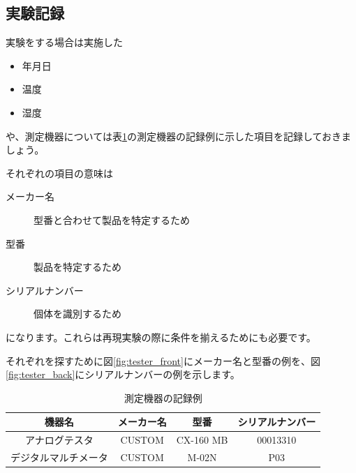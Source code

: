 \documentclass[dvipdfmx, a4paper]{jsarticle}
\begin{document}
\subsection{実験記録}
実験をする場合は実施した
\begin{itemize}
    \item 年月日
    \item 温度
    \item 湿度
\end{itemize}
や、測定機器については表\ref{tab:label_measure_table}の測定機器の記録例に示した項目を記録しておきましょう。

それぞれの項目の意味は
\begin{description}
    \item[メーカー名] 型番と合わせて製品を特定するため
    \item[型番] 製品を特定するため
    \item[シリアルナンバー] 個体を識別するため
\end{description}
になります。これらは再現実験の際に条件を揃えるためにも必要です。

それぞれを探すために図\ref{fig:tester_front}にメーカー名と型番の例を、図 \ref{fig:tester_back}にシリアルナンバーの例を示します。

\begin{table}[htbp]
    \centering
    \caption{測定機器の記録例}
    \label{tab:label_measure_table}
    \begin{tabular}{c|c|c|c} \hline
        機器名 & メーカー名 & 型番 & シリアルナンバー \\ \hline \hline
        アナログテスタ & CUSTOM & CX-160 MB & 00013310 \\ \hline
        デジタルマルチメータ & CUSTOM & M-02N & P03 \\ \hline
    \end{tabular}
\end{table}
\end{document}
